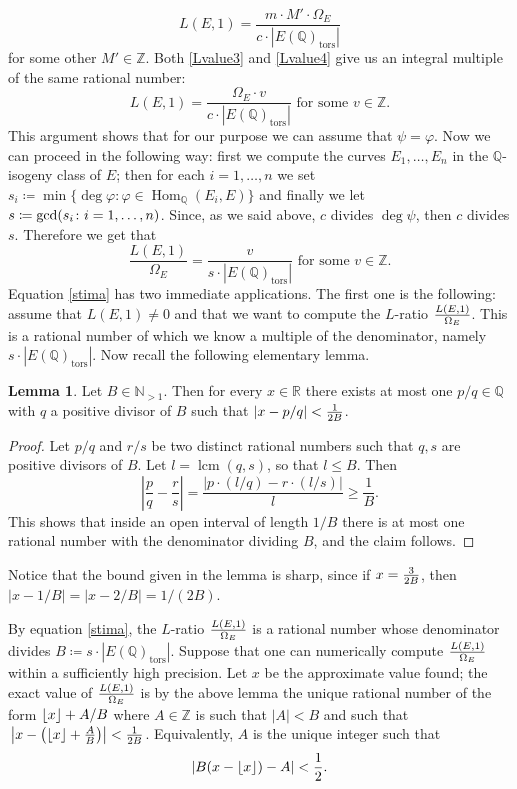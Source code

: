 \documentclass[11pt]{amsart}
\DeclarePairedDelimiter{\floor}{\lfloor}{\rfloor}
\theoremstyle{definition}
\newtheorem{lem}[definizione]{Lemma}
\begin{document}
			\begin{equation}\label{Lvalue4}
    				L(E,1)=\frac{m\cdot M'\cdot \Omega_E}{c\cdot |E({\mathbb{Q}})_{\text{tors}}|}
		\end{equation}
		for some other $M'\in {\mathbb{Z}}$. Both \eqref{Lvalue3} and \eqref{Lvalue4} give us an integral multiple of the same rational number:
		$$L(E,1)= \frac{\Omega_E\cdot v}{c\cdot |E({\mathbb{Q}})_{\text{tors}}|} \mbox{ for some } v\in {\mathbb{Z}}.$$
		This argument shows that for our purpose we can assume that $\psi=\varphi$. Now we can proceed in the following way: first we compute the curves $E_1,\dots,E_n$ in the ${\mathbb{Q}}$-isogeny class of $E$; then for each $i=1,\ldots,n$ we set $s_i\coloneqq \min\{\deg\varphi\colon \varphi \in \operatorname{Hom}_{\mathbb{Q}}(E_i,E)\}$ and finally we let ${\displaystyle} s\coloneqq \gcd(s_i\colon i=1,\ldots,n)$. Since, as we said above, $c$ divides $\deg\psi$, then $c$ divides $s$. Therefore we get that
		\begin{equation}\label{stima}
			\frac{L(E,1)}{\Omega_E}=\frac{v}{s\cdot|E({\mathbb{Q}})_{\text{tors}}|} \mbox{ for some } v\in {\mathbb{Z}}.
		\end{equation}
		Equation \eqref{stima} has two immediate applications. The first one is the following: assume that $L(E,1)\neq 0$ and that we want to compute the $L$-ratio ${\displaystyle} \frac{L(E,1)}{\Omega_E}$. This is a rational number of which we know a multiple of the denominator, namely $s\cdot|E({\mathbb{Q}})_{\text{tors}}|$. Now recall the following elementary lemma.
			\begin{lem}\label{Lratio}
				Let $B\in {\mathbb{N}}_{>1}$. Then for every $x\in {\mathbb{R}}$ there exists at most one $p/q\in {\mathbb{Q}}$ with $q$ a positive divisor of $B$ such that ${\displaystyle} |x-p/q|<\frac{1}{2B}$.
		\end{lem}
			\begin{proof}
				Let $p/q$ and $r/s$ be two distinct rational numbers such that $q,s$ are positive divisors of $B$. Let $l=\operatorname*{lcm}(q,s)$, so that $l\leq B$. Then
				$$\left|\frac{p}{q}-\frac{r}{s}\right|=\frac{|p\cdot (l/q)-r\cdot(l/s)|}{l}\geq \frac{1}{B}.$$
				This shows that inside an open interval of length $1/B$ there is at most one rational number with the denominator dividing $B$, and the claim follows.
		\end{proof}
		Notice that the bound given in the lemma is sharp, since if ${\displaystyle} x=\frac{3}{2B}$, then $|x-1/B|=|x-2/B|=1/(2B)$.

		By equation \eqref{stima}, the $L$-ratio ${\displaystyle} \frac{L(E,1)}{\Omega_E}$ is a rational number whose denominator divides $B\coloneqq s\cdot |E({\mathbb{Q}})_{\text{tors}}|$. Suppose that one can numerically compute ${\displaystyle} \frac{L(E,1)}{\Omega_E}$ within a sufficiently high precision.  Let $x$ be the approximate value found; the exact value of ${\displaystyle}\frac{L(E,1)}{\Omega_E}$ is by the above lemma the unique rational number of the form $\floor{x}+A/B$ where $A\in {\mathbb{Z}}$ is such that $|A|<B$ and such that ${\displaystyle} \left|x-\left(\floor{x}+\frac{A}{B}\right)\right|<\frac{1}{2B}$. Equivalently, $A$ is the unique integer such that
		$$|B(x-\floor{x})-A|<\frac{1}{2}.$$
\end{document}

